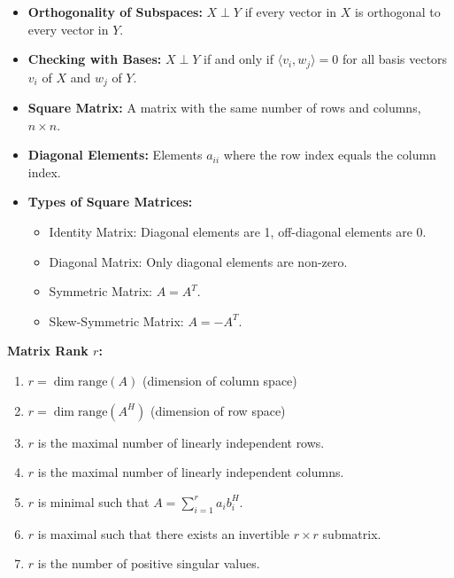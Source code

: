 \documentclass{article}
\begin{document}
\begin{itemize}[left=0pt]
    \item \textbf{Orthogonality of Subspaces:} \( X \perp Y \) if every vector in \( X \) is orthogonal to every vector in \( Y \).
    
    \item \textbf{Checking with Bases:} \( X \perp Y \) if and only if \( \langle v_i, w_j \rangle = 0 \) for all basis vectors \( v_i \) of \( X \) and \( w_j \) of \( Y \).
\end{itemize}

\begin{itemize}[left=0pt]
    \item \textbf{Square Matrix:} A matrix with the same number of rows and columns, \( n \times n \).
    
    \item \textbf{Diagonal Elements:} Elements \( a_{ii} \) where the row index equals the column index.
    
    \item \textbf{Types of Square Matrices:}
    \begin{itemize}[left=0pt]
        \item Identity Matrix: Diagonal elements are 1, off-diagonal elements are 0.
        \item Diagonal Matrix: Only diagonal elements are non-zero.
        \item Symmetric Matrix: \( A = A^T \).
        \item Skew-Symmetric Matrix: \( A = -A^T \).
    \end{itemize}
\end{itemize}

\textbf{Matrix Rank \( r \):}
\begin{enumerate}
    \item \( r = \dim \text{range}(A) \) (dimension of column space)
    \item \( r = \dim \text{range}(A^H) \) (dimension of row space)
    \item \( r \) is the maximal number of linearly independent rows.
    \item \( r \) is the maximal number of linearly independent columns.
    \item \( r \) is minimal such that \( A = \sum_{i=1}^r a_i b_i^H \).
    \item \( r \) is maximal such that there exists an invertible \( r \times r \) submatrix.
    \item \( r \) is the number of positive singular values.
\end{enumerate}
\end{document}
